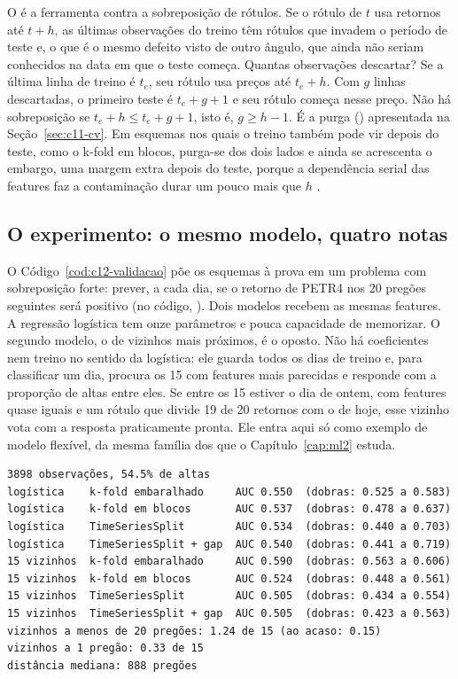 O  é a ferramenta contra a sobreposição de rótulos. Se o rótulo de $t$ usa retornos até $t+h$, as últimas observações do treino têm rótulos que invadem o período de teste e, o que é o mesmo defeito visto de outro ângulo, que ainda não seriam conhecidos na data em que o teste começa. Quantas observações descartar? Se a última linha de treino é $t_e$, seu rótulo usa preços até $t_e + h$. Com $g$ linhas descartadas, o primeiro teste é $t_e + g + 1$ e seu rótulo começa nesse preço. Não há sobreposição se $t_e + h \le t_e + g + 1$, isto é, $g \ge h - 1$. É a purga () apresentada na Seção~\ref{sec:c11-cv}. Em esquemas nos quais o treino também pode vir depois do teste, como o k-fold em blocos, purga-se dos dois lados e ainda se acrescenta o embargo, uma margem extra depois do teste, porque a dependência serial das features faz a contaminação durar um pouco mais que $h$ \citep[capítulo 7]{lopezdeprado2018}.

\subsection{O experimento: o mesmo modelo, quatro notas}

O Código~\ref{cod:c12-validacao} põe os esquemas à prova em um problema com sobreposição forte: prever, a cada dia, se o retorno de PETR4 nos 20 pregões seguintes será positivo (no código, ). Dois modelos recebem as mesmas features. A regressão logística tem onze parâmetros e pouca capacidade de memorizar. O segundo modelo, o de vizinhos mais próximos, é o oposto. Não há coeficientes nem treino no sentido da logística: ele guarda todos os dias de treino e, para classificar um dia, procura os 15 com features mais parecidas e responde com a proporção de altas entre eles. Se entre os 15 estiver o dia de ontem, com features quase iguais e um rótulo que divide 19 de 20 retornos com o de hoje, esse vizinho vota com a resposta praticamente pronta. Ele entra aqui só como exemplo de modelo flexível, da mesma família dos que o Capítulo~\ref{cap:ml2} estuda.


\begin{lstlisting}[style=saida]
3898 observações, 54.5% de altas
logística    k-fold embaralhado     AUC 0.550  (dobras: 0.525 a 0.583)
logística    k-fold em blocos       AUC 0.537  (dobras: 0.478 a 0.637)
logística    TimeSeriesSplit        AUC 0.534  (dobras: 0.440 a 0.703)
logística    TimeSeriesSplit + gap  AUC 0.540  (dobras: 0.441 a 0.719)
15 vizinhos  k-fold embaralhado     AUC 0.590  (dobras: 0.563 a 0.606)
15 vizinhos  k-fold em blocos       AUC 0.524  (dobras: 0.448 a 0.561)
15 vizinhos  TimeSeriesSplit        AUC 0.505  (dobras: 0.434 a 0.554)
15 vizinhos  TimeSeriesSplit + gap  AUC 0.505  (dobras: 0.423 a 0.563)
vizinhos a menos de 20 pregões: 1.24 de 15 (ao acaso: 0.15)
vizinhos a 1 pregão: 0.33 de 15
distância mediana: 888 pregões
\end{lstlisting}

